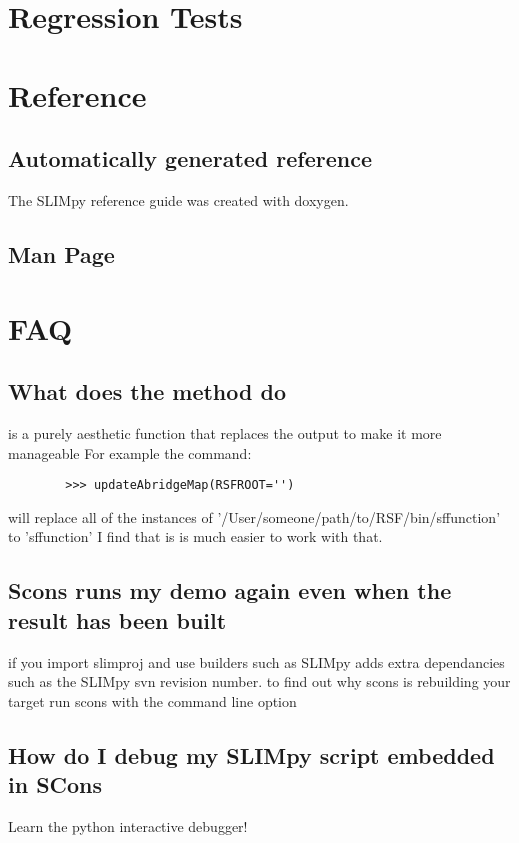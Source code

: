 \documentclass{manual}
\begin{document}
\chapter{Regression Tests}

    

\chapter{Reference}
    \section{Automatically generated reference}
    The SLIMpy reference guide was created with doxygen. 
    \section{Man Page}
    
    
\chapter{ FAQ }
	\section*{What does the  method do}
	 is a purely aesthetic function that replaces the output
	to make it more manageable For example the command:
\begin{verbatim} 
		>>> updateAbridgeMap(RSFROOT='')
\end{verbatim}
	will  replace all of the instances of
	'/User/someone/path/to/RSF/bin/sffunction' to 'sffunction'
	I find that is is much easier to work with that.

    \section*{Scons runs my demo again even when the result has been built}
    	if you import slimproj and use  builders such as  SLIMpy adds extra dependancies
	such as the SLIMpy svn revision number. to find out why scons is rebuilding your target run scons with the command line option 
	
    \section*{How do I debug my SLIMpy script embedded in SCons}
    Learn the python interactive debugger!
    
\end{document}
